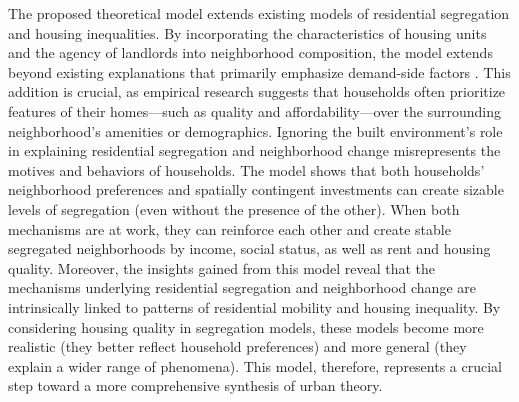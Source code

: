 The proposed theoretical model extends existing models of residential segregation and housing inequalities. By incorporating the characteristics of housing units and the agency of landlords into neighborhood composition, the model extends beyond existing explanations that primarily emphasize demand-side factors \citep{desmondPoorPayMore2019, rosenthalChangePersistenceEconomic2015}. This addition is crucial, as empirical research suggests that households often prioritize features of their homes—such as quality and affordability—over the surrounding neighborhood's amenities or demographics. Ignoring the built environment's role in explaining residential segregation and neighborhood change misrepresents the motives and behaviors of households. The model shows that both households' neighborhood preferences and spatially contingent investments can create sizable levels of segregation (even without the presence of the other). When both mechanisms are at work, they can reinforce each other and create stable segregated neighborhoods by income, social status, as well as rent and housing quality. Moreover, the insights gained from this model reveal that the mechanisms underlying residential segregation and neighborhood change are intrinsically linked to patterns of residential mobility and housing inequality. By considering housing quality in segregation models, these models become more realistic (they better reflect household preferences) and more general (they explain a wider range of phenomena). This model, therefore, represents a crucial step toward a more comprehensive synthesis of urban theory.



